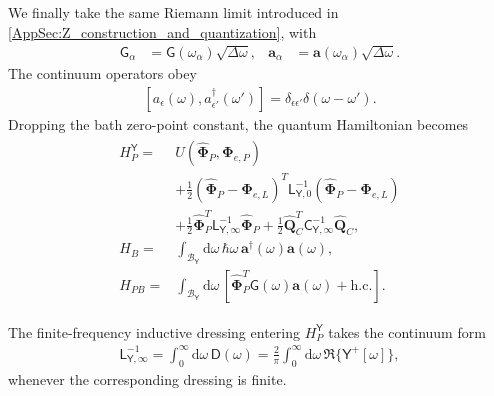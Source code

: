 \documentclass[prx,aps,twocolumn,article]{revtex4-2}
\newcommand{\msf}[1]{\mathsf{#1}}
\newcommand{\bsb}[1]{\boldsymbol{#1}}
\newcommand{\bPhi}{\bsb{\Phi}}
\newcommand{\bQ}{\bsb{Q}}
\newcommand{\ba}{\bsb{a}}
\newcommand{\msY}{\msf{Y}}
\newcommand{\msG}{\msf{G}}
\newcommand{\msL}{\msf{L}}
\newcommand{\msC}{\msf{C}}
\newcommand{\msD}{\msf{D}}
\begin{document}
We finally take the same Riemann limit introduced in
\cref{AppSec:Z_construction_and_quantization}, with
\begin{align}
    \msG_\alpha
    &=
    \msG(\omega_\alpha)
    \sqrt{\Delta\omega},
    &
    \ba_\alpha
    &=
    \ba(\omega_\alpha)
    \sqrt{\Delta\omega}.
\end{align}
The continuum operators obey
\begin{align}
    \left[
        a_\epsilon(\omega),
        a_{\epsilon'}^\dagger(\omega')
    \right]
    =
    \delta_{\epsilon\epsilon'}
    \delta(\omega-\omega').
\end{align}
Dropping the bath zero-point constant, the quantum Hamiltonian becomes
\begin{align}
\begin{aligned}
    H_P^\msY
    ={}&
    U(\hat{\bPhi}_P,\bPhi_{e,P})
    \\
    &+
    \frac{1}{2}
    \left(
        \hat{\bPhi}_P-\bPhi_{e,L}
    \right)^T
    \msL_{\msY,0}^{-1}
    \left(
        \hat{\bPhi}_P-\bPhi_{e,L}
    \right)
    \\
    &+
    \frac{1}{2}
    \hat{\bPhi}_P^T
    \msL_{\msY,\infty}^{-1}
    \hat{\bPhi}_P
    +
    \frac{1}{2}
    \hat{\bQ}_C^T
    \msC_{\msY,\infty}^{-1}
    \hat{\bQ}_C,
    \\
    H_B
    ={}&
    \int_{\mathcal B_{\msY}}
    \mathrm{d}\omega\,
    \hbar\omega\,
    \ba^\dag(\omega)
    \ba(\omega),
    \\
    H_{PB}
    ={}&
    \int_{\mathcal B_{\msY}}
    \mathrm{d}\omega\,
    \left[
        \hat{\bPhi}_P^T
        \msG(\omega)
        \ba(\omega)
        +
        \mathrm{h.c.}
    \right].
\end{aligned}
\label{Eq:YContinuumHamiltonian}
\end{align}

The finite-frequency inductive dressing entering $H_P^\msY$ takes the
continuum form
\begin{align}
    \msL_{\msY,\infty}^{-1}
    =
    \int_0^\infty
    \mathrm{d}\omega\,
    \msD(\omega)
    =
    \frac{2}{\pi}
    \int_0^\infty
    \mathrm{d}\omega\,
    \Re\{\msY^+[\omega]\},
    \label{Eq:YContinuumInductiveDressing}
\end{align}
whenever the corresponding dressing is finite.
\end{document}
